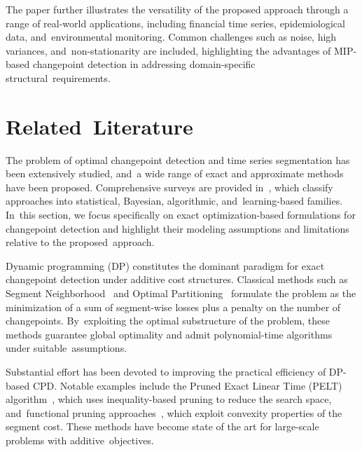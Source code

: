 \documentclass[mathematics,article,accept,pdftex,moreauthors]{Definitions/mdpi}
\begin{document}
The paper further illustrates the versatility of the proposed approach through a range of real-world applications, including financial time series, epidemiological data, and~environmental monitoring. Common challenges such as noise, high variances, and~non-stationarity are included, highlighting the advantages of MIP-based changepoint detection in addressing domain-specific structural~requirements.


\section{Related~Literature} 					\label{sec:literature}
The problem of optimal changepoint detection and time series segmentation has been extensively studied, and~a wide range of exact and approximate methods have been proposed. Comprehensive surveys are provided in~\cite{AC17,TOV20}, which classify approaches into statistical, Bayesian, algorithmic, and~learning-based families. In~this section, we focus specifically on exact optimization-based formulations for changepoint detection and highlight their modeling assumptions and limitations relative to the proposed~approach.

Dynamic programming (DP) constitutes the dominant paradigm for exact changepoint detection under additive cost structures. Classical methods such as Segment Neighborhood~\cite{AL89} and Optimal Partitioning~\cite{JSB05} formulate the problem as the minimization of a sum of segment-wise losses plus a penalty on the number of changepoints. By~exploiting the optimal substructure of the problem, these methods guarantee global optimality and admit polynomial-time algorithms under suitable~assumptions.

Substantial effort has been devoted to improving the practical efficiency of DP-based CPD. Notable examples include the Pruned Exact Linear Time (PELT) algorithm~\cite{KFE12}, which uses inequality-based pruning to reduce the search space, and~functional pruning approaches~\cite{R10,J13}, which exploit convexity properties of the segment cost. These methods have become state of the art for large-scale problems with additive~objectives.
\end{document}
